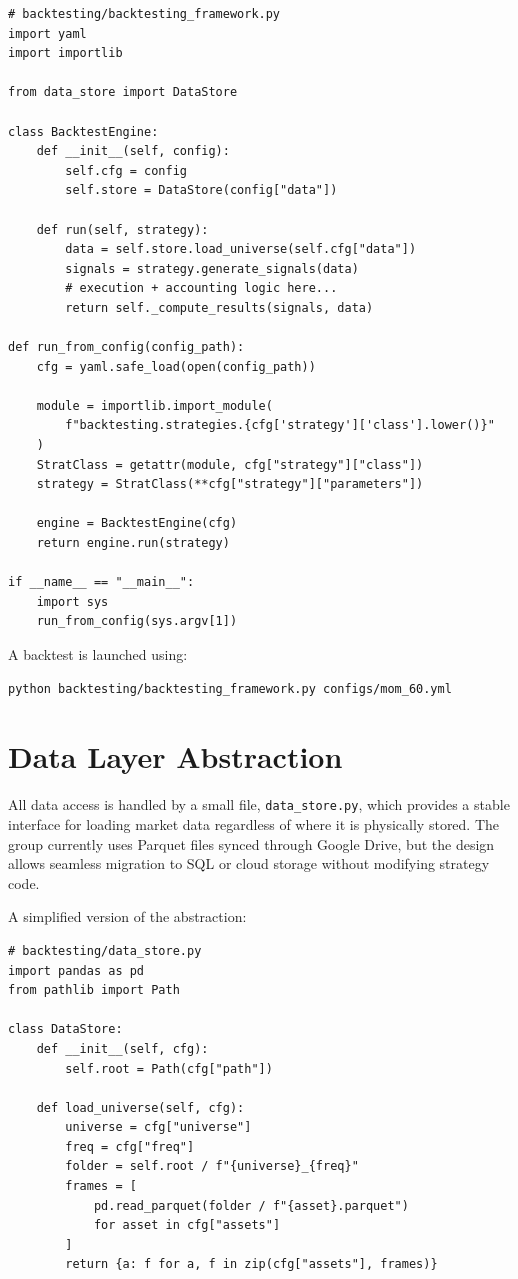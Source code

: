 \documentclass[11pt]{article}
\begin{document}
\begin{verbatim}
# backtesting/backtesting_framework.py
import yaml
import importlib

from data_store import DataStore

class BacktestEngine:
    def __init__(self, config):
        self.cfg = config
        self.store = DataStore(config["data"])

    def run(self, strategy):
        data = self.store.load_universe(self.cfg["data"])
        signals = strategy.generate_signals(data)
        # execution + accounting logic here...
        return self._compute_results(signals, data)

def run_from_config(config_path):
    cfg = yaml.safe_load(open(config_path))

    module = importlib.import_module(
        f"backtesting.strategies.{cfg['strategy']['class'].lower()}"
    )
    StratClass = getattr(module, cfg["strategy"]["class"])
    strategy = StratClass(**cfg["strategy"]["parameters"])

    engine = BacktestEngine(cfg)
    return engine.run(strategy)

if __name__ == "__main__":
    import sys
    run_from_config(sys.argv[1])
\end{verbatim}

A backtest is launched using:

\begin{verbatim}
python backtesting/backtesting_framework.py configs/mom_60.yml
\end{verbatim}


\section{Data Layer Abstraction}

All data access is handled by a small file, \texttt{data\_store.py}, which provides a 
stable interface for loading market data regardless of where it is physically stored.
The group currently uses Parquet files synced through Google Drive, but the design 
allows seamless migration to SQL or cloud storage without modifying strategy code.

A simplified version of the abstraction:

\begin{verbatim}
# backtesting/data_store.py
import pandas as pd
from pathlib import Path

class DataStore:
    def __init__(self, cfg):
        self.root = Path(cfg["path"])

    def load_universe(self, cfg):
        universe = cfg["universe"]
        freq = cfg["freq"]
        folder = self.root / f"{universe}_{freq}"
        frames = [
            pd.read_parquet(folder / f"{asset}.parquet")
            for asset in cfg["assets"]
        ]
        return {a: f for a, f in zip(cfg["assets"], frames)}
\end{verbatim}
\end{document}
